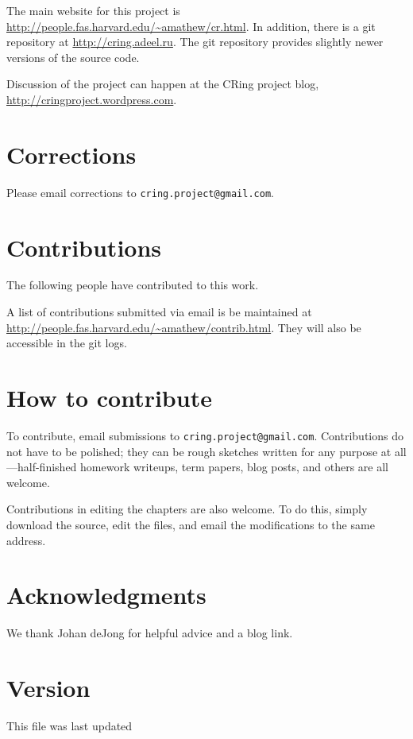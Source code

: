 The main website for this project is 
\url{http://people.fas.harvard.edu/~amathew/cr.html}. In addition, there is a
git repository at \url{http://cring.adeel.ru}. The git repository provides
slightly newer versions of the source code.

Discussion of the project can happen at the CRing project blog,
\url{http://cringproject.wordpress.com}.

\section*{Corrections}

Please email corrections to \texttt{cring.project@gmail.com}.

\section*{Contributions}

The following people have contributed to this work.

\vspace{5mm}
\vspace{5mm}

A list of contributions submitted via email is be maintained at 
\url{http://people.fas.harvard.edu/~amathew/contrib.html}.
They will also be accessible in the git logs.

\section*{How to contribute}

To contribute, email submissions to \texttt{cring.project@gmail.com}. 
Contributions do not have to be polished; they can be rough sketches written
for any purpose at all---half-finished homework writeups, term papers, blog
posts, and others are all welcome.

Contributions in editing the chapters are also welcome. To do this, simply
download the source, edit the files, and email the modifications to the same
address.

\section*{Acknowledgments}

We thank Johan deJong for helpful advice and a blog link.

\section*{Version}

This file was last updated 

\tableofcontents